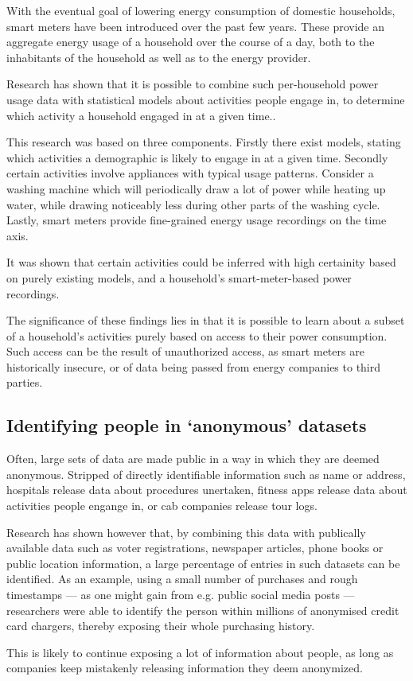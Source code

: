 \documentclass[a4paper]{scrreprt}
\begin{document}
With the eventual goal of lowering energy consumption of domestic households,
smart meters have been introduced over the past few years. These provide an
aggregate energy usage of a household over the course of a day, both to the
inhabitants of the household as well as to the energy provider.

Research has shown that it is possible to combine such per-household power
usage data with statistical models about activities people engage in, to
determine which activity a household engaged in at a given
time.\autocite{stankovicMeasuringEnergyIntensity2016}.

This research was based on three components. Firstly there exist models,
stating which activities a demographic is likely to engage in at a given time.
Secondly certain activities involve appliances with typical usage patterns.
Consider a washing machine which will periodically draw a lot of power while
heating up water, while drawing noticeably less during other parts of the
washing cycle. Lastly, smart meters provide fine-grained energy usage
recordings on the time axis.

It was shown that certain activities could be inferred with high certainity
based on purely existing models, and a household's smart-meter-based power
recordings.\autocite{stankovicMeasuringEnergyIntensity2016}

The significance of these findings lies in that it is possible to learn about a
subset of a household's activities purely based on access to their power
consumption. Such access can be the result of unauthorized access, as smart
meters are historically insecure\autocite{starrYourSmartElectricity2017}, or of
data being passed from energy companies to third parties.

\subsection{Identifying people in `anonymous' datasets}

Often, large sets of data are made public in a way in which they are deemed
anonymous. Stripped of directly identifiable information such as name or
address, hospitals release data about procedures unertaken, fitness apps
release data about activities people engange in, or cab companies release tour
logs. \autocite{solonDataFingerprintWhy2018}

Research has shown however that, by combining this data with publically
available data such as voter registrations, newspaper articles, phone books or
public location information, a large percentage of entries in such datasets can
be identified. As an example, using a small number of purchases and rough
timestamps --- as one might gain from e.g. public social media posts ---
researchers were able to identify the person within millions of anonymised
credit card chargers, thereby exposing their whole purchasing
history. \autocite{demontjoyeUniqueShoppingMall2015}

This is likely to continue exposing a lot of information about people, as long
as companies keep mistakenly releasing information they deem anonymized.

\printbibliography
\end{document}
